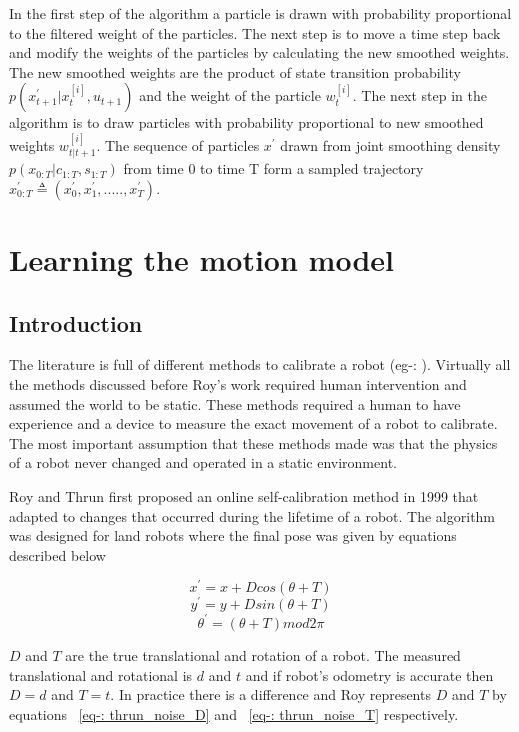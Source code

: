 \documentclass[12pt]{dalcsthesis}
\begin{document}
In the first step of the algorithm a particle is drawn with probability proportional to the filtered weight of the particles. The next step is to move a time step back and modify the weights of the particles by calculating the new smoothed weights. The new smoothed weights are the product of state transition probability $p(x ^{'} _{t+1}|x_{t}^{[i]},u _{t+1})$ and the weight of the particle $w_{t}^{[i]}$. The next step in the algorithm is to draw particles with probability proportional to new smoothed weights $w_{t|t+1}^{[i]}$.  The sequence of particles $x^{'}$ drawn from joint smoothing density $p(x_{0:T}|c_{1:T},s_{1:T})$ from time 0 to time T form a sampled trajectory $x^{'}_{0:T} \triangleq (x^{'}_0,x^{'}_1,.....,x^{'}_T)$.
 
\chapter{Learning the motion model}
\label{learning the motion model}
\section{Introduction}
The literature is full of different methods to calibrate a robot (eg-: \cite{cox1990autonomous} \cite{vukobratovic1989introduction}). Virtually all the methods discussed before Roy's work \cite{Roy} required human intervention and assumed the world to be static. These methods required a human to have experience and a device to measure the exact movement of a robot to calibrate. The most important assumption that these methods made was that the physics of a robot never changed and operated in a static environment. 

Roy and Thrun first proposed an online self-calibration method \cite{Roy} in 1999 that adapted to changes that occurred during the lifetime of a robot. The algorithm was designed for land robots where the final pose was given by equations described below

\begin{equation}
x^{'}=x+Dcos(\theta+T)
\end{equation}
\begin{equation}
y^{'}=y+Dsin(\theta+T)
\end{equation}
\begin{equation}
\theta^{'}=(\theta+T)mod2\pi
\end{equation}

$D$ and $T$ are the true translational and rotation of a robot. The measured translational and rotational is $d$ and $t$ and if robot's odometry is accurate then $D=d$ and $T=t$. In practice there is a difference and Roy represents $D$ and $T$ by equations ~\ref{eq-: thrun_noise_D} and ~\ref{eq-: thrun_noise_T} respectively.
\end{document}
